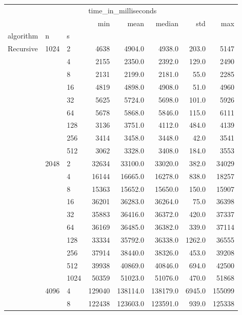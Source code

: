 \begin{tabular}{lllrrrrr}
\toprule
          &      &      & \multicolumn{5}{l}{time\_in\_milliseconds} \\
          &      &      &                  min &      mean &    median &     std &     max \\
algorithm & n & s &                      &           &           &         &         \\
\midrule
Recursive & 1024 & 2    &                 4638 &    4904.0 &    4938.0 &   203.0 &    5147 \\
          &      & 4    &                 2155 &    2350.0 &    2392.0 &   129.0 &    2490 \\
          &      & 8    &                 2131 &    2199.0 &    2181.0 &    55.0 &    2285 \\
          &      & 16   &                 4819 &    4898.0 &    4908.0 &    51.0 &    4960 \\
          &      & 32   &                 5625 &    5724.0 &    5698.0 &   101.0 &    5926 \\
          &      & 64   &                 5678 &    5868.0 &    5846.0 &   115.0 &    6111 \\
          &      & 128  &                 3136 &    3751.0 &    4112.0 &   484.0 &    4139 \\
          &      & 256  &                 3414 &    3458.0 &    3448.0 &    42.0 &    3541 \\
          &      & 512  &                 3062 &    3328.0 &    3408.0 &   184.0 &    3553 \\
          & 2048 & 2    &                32634 &   33100.0 &   33020.0 &   382.0 &   34029 \\
          &      & 4    &                16144 &   16665.0 &   16278.0 &   838.0 &   18257 \\
          &      & 8    &                15363 &   15652.0 &   15650.0 &   150.0 &   15907 \\
          &      & 16   &                36201 &   36283.0 &   36264.0 &    75.0 &   36398 \\
          &      & 32   &                35883 &   36416.0 &   36372.0 &   420.0 &   37337 \\
          &      & 64   &                36169 &   36485.0 &   36382.0 &   339.0 &   37114 \\
          &      & 128  &                33334 &   35792.0 &   36338.0 &  1262.0 &   36555 \\
          &      & 256  &                37914 &   38440.0 &   38326.0 &   453.0 &   39208 \\
          &      & 512  &                39938 &   40869.0 &   40846.0 &   694.0 &   42500 \\
          &      & 1024 &                50359 &   51023.0 &   51076.0 &   470.0 &   51868 \\
          & 4096 & 4    &               129040 &  138114.0 &  138179.0 &  6945.0 &  155099 \\
          &      & 8    &               122438 &  123603.0 &  123591.0 &   939.0 &  125338 \\
\bottomrule
\end{tabular}

